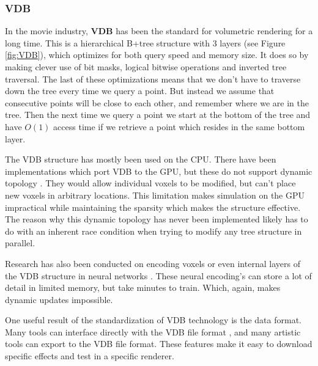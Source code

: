 \subsubsection{VDB} \label{related_work:voxel_data_structures:vdb}
In the movie industry, \textbf{VDB} \cite{museth2013vdb} has been the standard for volumetric rendering for a long time. This is a hierarchical B+tree structure with 3 layers (see Figure \ref{fig:VDB}), which optimizes for both query speed and memory size. It does so by making clever use of bit masks, logical bitwise operations and inverted tree traversal. The last of these optimizations means that we don't have to traverse down the tree every time we query a point. But instead we assume that consecutive points will be close to each other, and remember where we are in the tree. Then the next time we query a point we start at the bottom of the tree and have $O(1)$ access time if we retrieve a point which resides in the same bottom layer.

The VDB structure has mostly been used on the CPU. There have been implementations which port VDB to the GPU, but these do not support dynamic topology \cite{hoetzlein2016gvdb} \cite{museth2021nanovdb}. They would allow individual voxels to be modified, but can't place new voxels in arbitrary locations. This limitation makes simulation on the GPU impractical while maintaining the sparsity which makes the structure effective. The reason why this dynamic topology has never been implemented likely has to do with an inherent race condition when trying to modify any tree structure in parallel.

Research has also been conducted on encoding voxels or even internal layers of the VDB structure in neural networks \cite{kim2022neuralvdb}. These neural encoding's can store a lot of detail in limited memory, but take minutes to train. Which, again, makes dynamic updates impossible.

One useful result of the standardization of VDB technology is the data format. Many tools can interface directly with the VDB file format \cite{VDBADeepDive}, and many artistic tools can export to the VDB file format. These features make it easy to download specific effects and test in a specific renderer.

